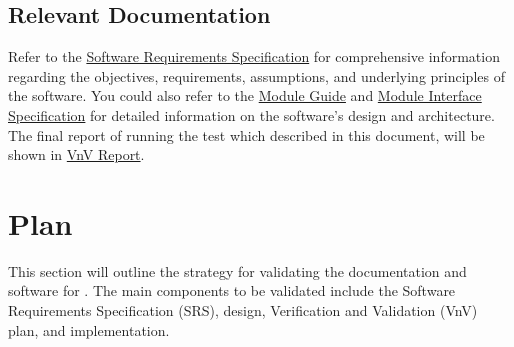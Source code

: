 \documentclass[12pt, titlepage]{article}
\begin{document}

\subsection{Relevant Documentation}

Refer to the 
\href{https://github.com/mirzaim/ipcs/blob/main/docs/SRS/SRS.pdf}{Software 
Requirements Specification} for comprehensive information regarding 
the objectives, requirements, assumptions, and underlying 
principles of the software. You could also refer to the
\href{https://github.com/mirzaim/ipcs/blob/main/docs/Design/SoftArchitecture/MG.pdf}{Module Guide} and 
\href{https://github.com/mirzaim/ipcs/blob/main/docs/Design/SoftDetailedDes/MIS.pdf}{Module Interface Specification}
for detailed information on the software's design and architecture.
The final report of running the test which described in this document, 
will be shown in \href{https://github.com/mirzaim/ipcs/blob/main/docs/VnVReport/VnVReport.pdf}{VnV Report}.




\section{Plan}

This section will outline the strategy for validating the documentation 
and software for \progname{}. The main components to be validated 
include the Software Requirements Specification (SRS), design, 
Verification and Validation (VnV) plan, and implementation.


\end{document}
